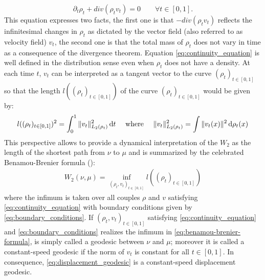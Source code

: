 \begin{equation}\label{eq:continuity_equation}
\partial_t \rho_t + div(\rho_t v_t ) = 0 \qquad \forall t\in[0,1].
\end{equation}
This equation expresses two facts, the first one is that $-div(\rho_t v_t)$ reflects the infinitesimal changes in $\rho_t$ as dictated by the vector field (also referred to as velocity field) $v_t$, the second one is that the total mass of $\rho_t$ does not vary in time as a consequence of the divergence theorem. Equation \cref{eq:continuity_equation} is well defined in the distribution sense even when $\rho_t$ does not have a density. At each time $t$, $v_t$ can be interpreted as a tangent vector to the curve $(\rho_t)_{t\in[0,1]}$ so that the length $l((\rho_t)_{t\in[0,1]})$ of the curve $(\rho_t)_{t\in[0,1]}$ would be given by:
\begin{equation}
l((\rho_t)_{t\in[0,1]})^2 = \int_0^1 \Vert v_t \Vert^2_{L_2(\rho_t)} \mathop{}\!\mathrm{d} t \quad \text{ where } \quad 
\Vert v_t \Vert^2_{L_2(\rho_t)} =  \int \Vert v_t(x) \Vert^2 \mathop{}\!\mathrm{d} \rho_t(x)
\end{equation}
This perspective allows to provide a dynamical interpretation of the $W_2$ as the length  of the shortest path from $\nu$ to $\mu$ and is summarized by the celebrated Benamou-Brenier formula (\cite{benamou2000computational}):
\begin{align}\label{eq:benamou-brenier-formula}
W_2(\nu,\mu) = \inf_{(\rho_t,v_t)_{t\in[0,1]}} l((\rho_t)_{t\in[0,1]})
\end{align}
where the infimum is taken  over all couples  $\rho$ and $v$ satisfying  \cref{eq:continuity_equation}  with boundary conditions given by \cref{eq:boundary_conditions}. If $(\rho_t,v_t)_{t\in[0,1]}$ satisfying  \cref{eq:continuity_equation} and \cref{eq:boundary_conditions} realizes the infimum in \eqref{eq:benamou-brenier-formula}, is simply called a geodesic between $\nu$ and $\mu$; moreover it is called a constant-speed geodesic if the norm of $v_t$ is constant for all $t\in[0,1]$. In consequence, \cref{eq:displacement_geodesic} is a constant-speed displacement geodesic. 

